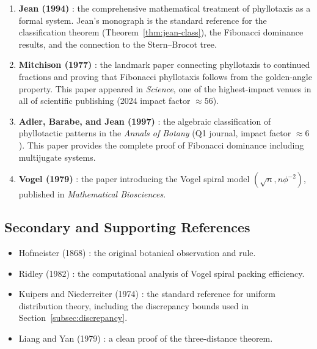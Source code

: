 \begin{enumerate}
  \item \textbf{Jean (1994)} \cite{jean1994phyllotaxis}: the
        comprehensive mathematical treatment of phyllotaxis as a
        formal system.  Jean's monograph is the standard reference for
        the classification theorem (Theorem~\ref{thm:jean-class}),
        the Fibonacci dominance results, and the connection to the
        Stern--Brocot tree.

  \item \textbf{Mitchison (1977)} \cite{mitchison1977phyllotaxis}: the
        landmark paper connecting phyllotaxis to continued fractions and
        proving that Fibonacci phyllotaxis follows from the golden-angle
        property.  This paper appeared in \emph{Science}, one of the
        highest-impact venues in all of scientific publishing (2024
        impact factor $\approx 56$).

  \item \textbf{Adler, Barabe, and Jean (1997)} \cite{adler1997phyllotaxis}:
        the algebraic classification of phyllotactic patterns in the
        \emph{Annals of Botany} (Q1 journal, impact factor $\approx 6$).
        This paper provides the complete proof of Fibonacci dominance
        including multijugate systems.

  \item \textbf{Vogel (1979)} \cite{vogel1979better}: the paper
        introducing the Vogel spiral model $(\sqrt{n}, n\phi^{-2})$,
        published in \emph{Mathematical Biosciences}.
\end{enumerate}

\subsection{Secondary and Supporting References}
\label{subsec:secondary-refs}

\begin{itemize}
  \item Hofmeister (1868) \cite{hofmeister1868allgemeine}: the original
        botanical observation and rule.

  \item Ridley (1982) \cite{ridley1982packing}: the computational
        analysis of Vogel spiral packing efficiency.

  \item Kuipers and Niederreiter (1974) \cite{kuipers1974uniform}:
        the standard reference for uniform distribution theory,
        including the discrepancy bounds used in
        Section~\ref{subsec:discrepancy}.

  \item Liang and Yan (1979) \cite{liang1979three}: a clean proof of
        the three-distance theorem.
\end{itemize}

